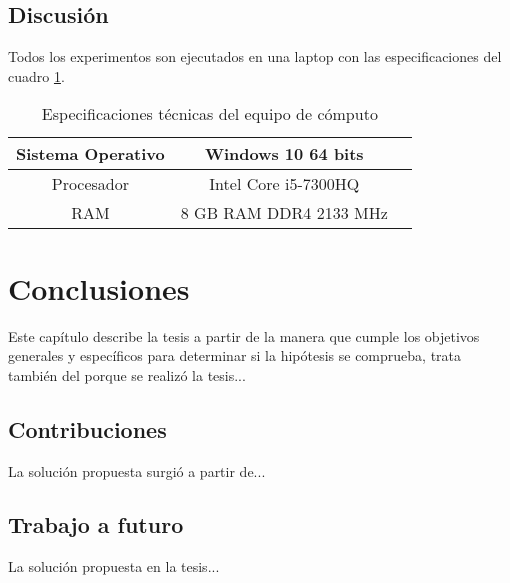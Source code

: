 \section{Discusión}
Todos los experimentos son ejecutados en una laptop con las especificaciones del cuadro \ref{tab:Especificaciones técnicas del PC}.

\begin{table}[H]
	{\centering
		\caption{Especificaciones técnicas del equipo de cómputo}
		\begin{tabular}{|c|c|c|}
			\hline
			Sistema Operativo & Windows 10 64 bits\\
			\hline
			Procesador & Intel Core i5-7300HQ\\
			\hline
			RAM & 8 GB RAM DDR4 2133 MHz\\
			\hline
		\end{tabular}

	\label{tab:Especificaciones técnicas del PC}
	}
\end{table}


\chapter{Conclusiones}
Este capítulo describe la tesis a partir de la manera que cumple los objetivos generales y específicos para determinar si la hipótesis se comprueba, trata también del porque se realizó la tesis...

\clearpage

\section{Contribuciones}
La solución propuesta surgió a partir de...

\section{Trabajo a futuro}
La solución propuesta en la tesis...